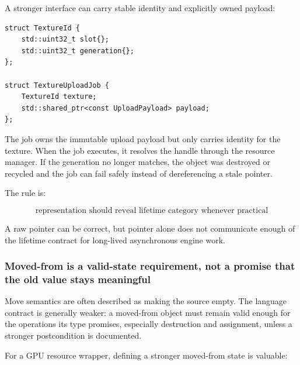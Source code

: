 A stronger interface can carry stable identity and explicitly owned payload:

\begin{verbatim}
struct TextureId {
    std::uint32_t slot{};
    std::uint32_t generation{};
};

struct TextureUploadJob {
    TextureId texture;
    std::shared_ptr<const UploadPayload> payload;
};
\end{verbatim}

The job owns the immutable upload payload but only carries identity for the texture. When the job executes, it resolves the handle through the resource manager. If the generation no longer matches, the object was destroyed or recycled and the job can fail safely instead of dereferencing a stale pointer.

The rule is:

\[
\boxed{
\text{representation should reveal lifetime category whenever practical}
}
\]

A raw pointer can be correct, but pointer alone does not communicate enough of the lifetime contract for long-lived asynchronous engine work.

\subsubsection{Moved-from is a valid-state requirement, not a promise that the old value stays meaningful}\label{01-foundations-i-ch005-moved-from-is-a-valid-state-requirement-not-a-promise-that-the-old-value-stays-meaningful}

Move semantics are often described as making the source empty. The language contract is generally weaker: a moved-from object must remain valid enough for the operations its type promises, especially destruction and assignment, unless a stronger postcondition is documented.

For a GPU resource wrapper, defining a stronger moved-from state is valuable:

